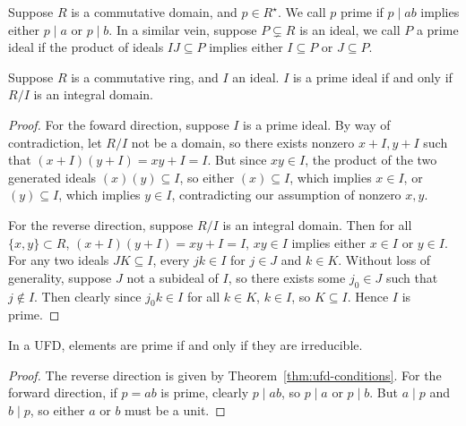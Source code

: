 \begin{definition}
    Suppose \(R\) is a commutative domain, and \(p \in R^\star\).
    We call \(p\) prime if \(p \mid ab\)
    implies either \(p \mid a\) or \(p \mid b\).
    In a similar vein, suppose \(P \subsetneq R\) is an ideal,
    we call \(P\) a prime ideal if the product of ideals \(IJ \subseteq P\)
    implies either \(I \subseteq P\) or \(J \subseteq P\).
\end{definition}
\begin{proposition}\label{prop:prime-quotient-domain}
    Suppose \(R\) is a commutative ring, and \(I\) an ideal.
    \(I\) is a prime ideal if and only if \(R/I\) is an integral domain.
\end{proposition}
\begin{proof}
    For the foward direction, suppose \(I\) is a prime ideal.
    By way of contradiction, let \(R/I\) not be a domain,
    so there exists nonzero \(x+I, y+I\) such that \((x+I)(y+I) = xy+I = I\).
    But since \(xy \in I\),
    the product of the two generated ideals \((x)(y) \subseteq I\),
    so either \((x) \subseteq I\), which implies \(x \in I\),
    or \((y) \subseteq I\), which implies \(y \in I\),
    contradicting our assumption of nonzero \(x,y\).

    For the reverse direction, suppose \(R/I\) is an integral domain.
    Then for all \(\{x,y\} \subset R\), \((x+I)(y+I) = xy+I = I\),
    \(xy \in I\) implies either \(x \in I\) or \(y \in I\).
    For any two ideals \(JK \subseteq I\),
    every \(jk \in I\) for \(j \in J\) and \(k \in K\).
    Without loss of generality, suppose \(J\) not a subideal of \(I\),
    so there exists some \(j_0 \in J\) such that \(j \notin I\).
    Then clearly since \(j_0 k \in I\) for all \(k \in K\),
    \(k \in I\), so \(K \subseteq I\).
    Hence \(I\) is prime.
\end{proof}

\begin{lemma}
    In a UFD, elements are prime if and only if they are irreducible.
\end{lemma}
\begin{proof}
    The reverse direction is given by Theorem~\ref{thm:ufd-conditions}.
    For the forward direction,
    if \(p = ab\) is prime, clearly \(p \mid ab\),
    so \(p \mid a\) or \(p \mid b\).
    But \(a \mid p\) and \(b \mid p\),
    so either \(a\) or \(b\) must be a unit.
\end{proof}

